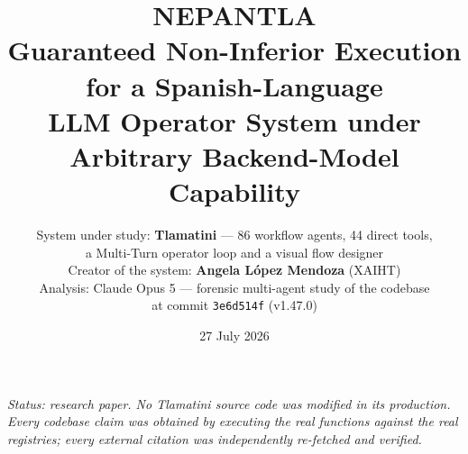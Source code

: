 \documentclass[11pt,a4paper]{article}
\theoremstyle{plain}
\theoremstyle{definition}
\theoremstyle{remark}
\newcommand{\code}[1]{\texttt{\small #1}}
\begin{document}
\title{\textbf{NEPANTLA}\\[0.35em]
  \large Guaranteed Non-Inferior Execution for a Spanish-Language\\
  LLM Operator System under Arbitrary Backend-Model Capability}

\author{%
  System under study: \textbf{Tlamatini} --- 86 workflow agents, 44 direct tools,\\
  a Multi-Turn operator loop and a visual flow designer\\[0.4em]
  Creator of the system: \textbf{Angela L\'opez Mendoza} \; (XAIHT)\\[0.2em]
  Analysis: Claude Opus 5 --- forensic multi-agent study of the codebase\\
  at commit \code{3e6d514f} (v1.47.0)%
}

\date{27 July 2026}

\maketitle

\begin{abstract}

\end{abstract}

\vspace{1em}
\begin{center}
\begin{minipage}{0.86\textwidth}
\footnotesize\itshape
Status: research paper. No Tlamatini source code was modified in its
production. Every codebase claim was obtained by executing the real functions
against the real registries; every external citation was independently
re-fetched and verified.
\end{minipage}
\end{center}

\clearpage
\tableofcontents
\clearpage












\clearpage

\end{document}
